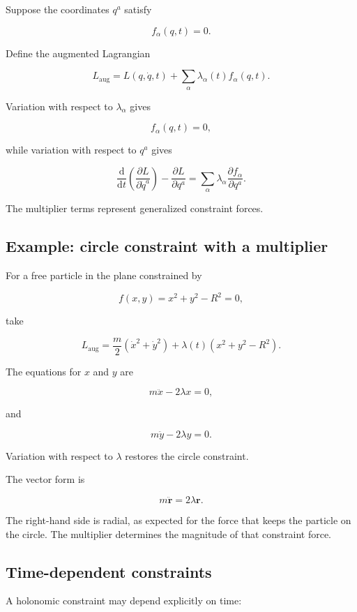 Suppose the coordinates \(q^{a}\) satisfy

\[
f_{\alpha}(q,t)=0.
\]

Define the augmented Lagrangian

\[
L_{\mathrm{aug}}
=
L(q,\dot q,t)
+
\sum_{\alpha}
\lambda_{\alpha}(t)
f_{\alpha}(q,t).
\]

Variation with respect to \(\lambda_{\alpha}\) gives

\[
f_{\alpha}(q,t)=0,
\]

while variation with respect to \(q^{a}\) gives

\[
\frac{\mathrm{d}}{\mathrm{d}t}
\left(
\frac{\partial L}{\partial\dot q^{a}}
\right)
-
\frac{\partial L}{\partial q^{a}}
=
\sum_{\alpha}
\lambda_{\alpha}
\frac{\partial f_{\alpha}}{\partial q^{a}}.
\]

The multiplier terms represent generalized constraint forces.

\subsection{Example: circle constraint with a multiplier}

For a free particle in the plane constrained by

\[
f(x,y)=x^{2}+y^{2}-R^{2}=0,
\]

take

\[
L_{\mathrm{aug}}
=
\frac{m}{2}
\left(
\dot x^{2}+\dot y^{2}
\right)
+
\lambda(t)
\left(
x^{2}+y^{2}-R^{2}
\right).
\]

The equations for \(x\) and \(y\) are

\[
m\ddot x-2\lambda x=0,
\]

and

\[
m\ddot y-2\lambda y=0.
\]

Variation with respect to \(\lambda\) restores the circle constraint.

The vector form is

\[
m\ddot{\mathbf{r}}
=
2\lambda\mathbf{r}.
\]

The right-hand side is radial, as expected for the force that keeps the particle on the circle. The multiplier determines the magnitude of that constraint force.

\subsection{Time-dependent constraints}

A holonomic constraint may depend explicitly on time:

